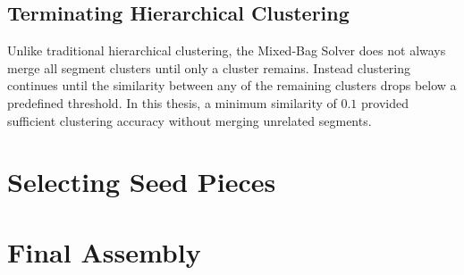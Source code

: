 \subsection{Terminating Hierarchical Clustering}

Unlike traditional hierarchical clustering, the Mixed-Bag Solver does not always merge all segment clusters  until only a cluster remains. Instead clustering continues until the similarity between any of the remaining clusters drops below a predefined threshold.  In this thesis, a minimum similarity of $0.1$ provided sufficient clustering accuracy without merging unrelated segments.

\section{Selecting Seed Pieces}

\section{Final Assembly}